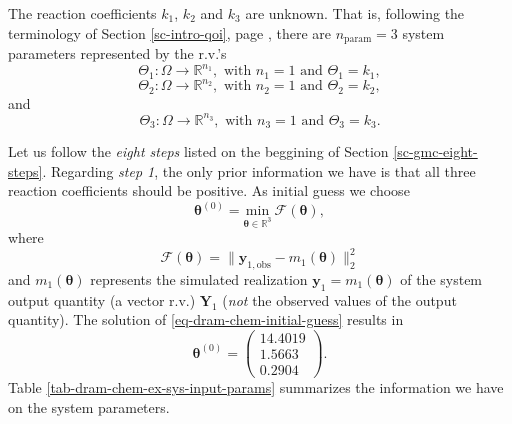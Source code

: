 The reaction coefficients $k_1$, $k_2$ and $k_3$ are unknown.
That is,
following the terminology of Section \ref{sc-intro-qoi}, page \pageref{sc-intro-qoi},
there are $n_{\text{param}}=3$ system parameters
represented by the r.v.'s
\begin{equation*}
\Theta_1:\Omega\rightarrow\mathbb{R}^{n_1},\text{ with }n_1=1\text{ and }\Theta_1=k_1,
\end{equation*}
\begin{equation*}
\Theta_2:\Omega\rightarrow\mathbb{R}^{n_2},\text{ with }n_2=1\text{ and }\Theta_2=k_2,
\end{equation*}
and
\begin{equation*}
\Theta_3:\Omega\rightarrow\mathbb{R}^{n_3},\text{ with }n_3=1\text{ and }\Theta_3=k_3.
\end{equation*}

Let us follow the {\it eight steps} listed on the beggining of Section \ref{sc-gmc-eight-steps}.
Regarding {\it step 1},
the only prior information we have is that all three reaction coefficients should be positive.
As initial guess we choose
\begin{equation}\label{eq-dram-chem-initial-guess}
\boldsymbol{\theta}^{(0)} = \underset{\boldsymbol{\theta}\in\mathbb{R}^3}{\text{min}}~\mathcal{F}(\boldsymbol{\theta}),
\end{equation}
where
\begin{equation*}
\mathcal{F}(\boldsymbol{\theta}) = \|\mathbf{y}_{1,\text{obs}}-m_1(\boldsymbol{\theta})\|_2^2
\end{equation*}
and $m_1(\boldsymbol{\theta})$ represents the simulated realization $\mathbf{y}_1=m_1(\boldsymbol{\theta})$ of the system output quantity (a vector r.v.) $\mathbf{Y}_1$ ({\it not} the observed values of the output quantity).
The solution of \eqref{eq-dram-chem-initial-guess} results in
\begin{equation*}
\boldsymbol{\theta}^{(0)}
=
\left(
\begin{array}{c}
14.4019 \\
 1.5663 \\
 0.2904
\end{array}
\right).
\end{equation*}
Table \ref{tab-dram-chem-ex-sys-input-params} summarizes the information we have on the system parameters.

